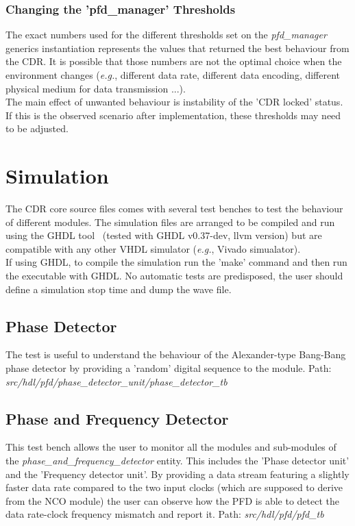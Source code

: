 \documentclass[11pt]{article}
\renewcommand{\>}{\rangle} \renewcommand{\emptyset}{\varnothing}
\begin{document}
\subsubsection{Changing the 'pfd\_manager' Thresholds}
The exact numbers used for the different thresholds set on the
\textit{pfd\_manager} generics instantiation represents the values that returned
the best behaviour from the CDR. It is possible that those numbers are not the
optimal choice when the environment changes (\textit{e.g.}, different data rate,
different data encoding, different physical medium for data transmission ...).\\
The main effect of unwanted behaviour is instability of the 'CDR locked' status.
If this is the observed scenario after implementation, these thresholds may need
to be adjusted.

\section{Simulation}
The CDR core source files comes with several test benches to test the behaviour
of different modules. The simulation files are arranged to be compiled and run
using the GHDL tool~\cite{ref:ghdl} (tested with GHDL v0.37-dev, llvm version)
but are compatible
with any other VHDL simulator (\textit{e.g.}, Vivado simualator).\\
If using GHDL, to compile the simulation run the 'make' command and then run the
executable with GHDL. No automatic tests are predisposed, the user should define
a simulation stop time and dump the wave file.

\subsection{Phase Detector}
The test is useful to understand the behaviour of the Alexander-type Bang-Bang
phase detector by providing a 'random' digital sequence to the module.\bigbreak
Path: \textit{src/hdl/pfd/phase\_detector\_unit/phase\_detector\_tb}

\subsection{Phase and Frequency Detector}
This test bench allows the user to monitor all the modules and sub-modules of
the \textit{phase\_and\_frequency\_detector} entity. This includes the 'Phase
detector unit' and the 'Frequency detector unit'. By providing a data stream
featuring a slightly faster data rate compared to the two input clocks (which
are supposed to derive from the NCO module) the user can observe how the PFD is
able to detect the data rate-clock frequency mismatch and report it.\bigbreak
Path: \textit{src/hdl/pfd/pfd\_tb}
\end{document}
